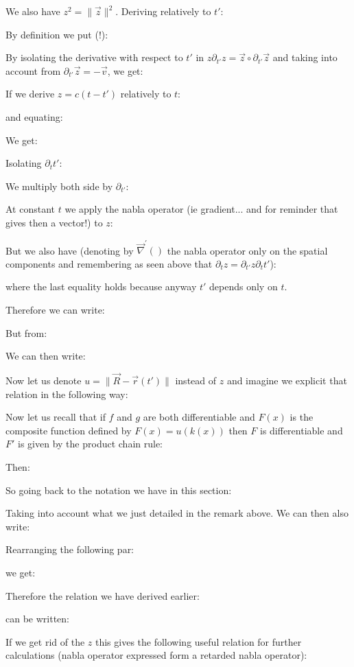 	We also have $z^2=\|\vec{z}\|^2$. Deriving relatively to $t'$:
	
	By definition we put (!): 
		
	By isolating the derivative with respect to $t'$ in $z\partial_{t'}z=\vec{z}\circ\partial_{t'}\vec{z}$ and taking into account from $\partial_{t'}\vec{z}=-\vec{v}$, we get:
	
	If we derive $z=c(t-t')$ relatively to $t$:
	
	and equating:
	
	We get:
	
	Isolating $\partial_tt'$:
	
	We multiply both side by $\partial_{t'}$:
	
	At constant $t$ we apply the nabla operator (ie gradient... and for reminder that gives then a vector!) to $z$:
	
	But we also have (denoting by $\vec{\nabla}^\prime()$ the nabla operator only on the spatial components and remembering as seen above that $\partial_t z=\partial_{t'}z\partial_tt'$):
	
	where the last equality holds because anyway $t'$ depends only on $t$.
	
	Therefore we can write:
	
	But from:
	
	We can then write:
	
	\begin{tcolorbox}[title=Remark,colframe=black,arc=10pt]
	Now let us denote $u=\|\vec{R}-\vec{r}(t')\|$ instead of $z$ and imagine we explicit that relation in the following way:
	
	Now let us recall that if $f$ and $g$ are both differentiable and $F(x)$ is the composite function defined by $F(x)=u(k(x))$ then $F$ is differentiable and $F'$ is given by  the product chain rule:
	
	Then:
	
	So going back to the notation we have in this section:
	
	\end{tcolorbox}
	Taking into account what we just detailed in the remark above. We can then also write:
	
	Rearranging the following par:
	
	we get:
	
	Therefore the relation we have derived earlier:
	
	can be written:
	
	If we get rid of the $z$ this gives the following useful relation for further calculations (nabla operator expressed form a retarded nabla operator):
	

